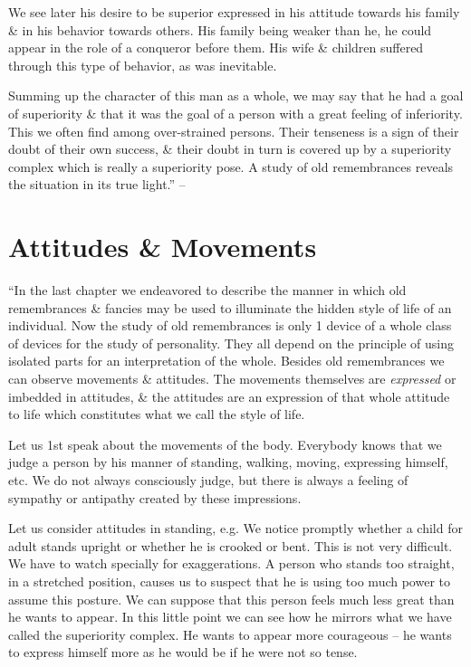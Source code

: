 \documentclass{article}
\numberwithin{equation}{section}
\begin{document}
We see later his desire to be superior expressed in his attitude towards his family \& in his behavior towards others. His family being weaker than he, he could appear in the role of a conqueror before them. His wife \& children suffered through this type of behavior, as was inevitable.

Summing up the character of this man as a whole, we may say that he had a goal of superiority \& that it was the goal of a person with a great feeling of inferiority. This we often find among over-strained persons. Their tenseness is a sign of their doubt of their own success, \& their doubt in turn is covered up by a superiority complex which is really a superiority pose. A study of old remembrances reveals the situation in its true light.'' -- \cite[pp. 117--134]{Adler2013}


\section{Attitudes \& Movements}
``In the last chapter we endeavored to describe the manner in which old remembrances \& fancies may be used to illuminate the hidden style of life of an individual. Now the study of old remembrances is only 1 device of a whole class of devices for the study of personality. They all depend on the principle of using isolated parts for an interpretation of the whole. Besides old remembrances we can observe movements \& attitudes. The movements themselves are \textit{expressed} or imbedded in attitudes, \& the attitudes are an expression of that whole attitude to life which constitutes what we call the style of life.

Let us 1st speak about the movements of the body. Everybody knows that we judge a person by his manner of standing, walking, moving, expressing himself, etc. We do not always consciously judge, but there is always a feeling of sympathy or antipathy created by these impressions.

Let us consider attitudes in standing, e.g. We notice promptly whether a child for adult stands upright or whether he is crooked or bent. This is not very difficult. We have to watch specially for exaggerations. A person who stands too straight, in a stretched position, causes us to suspect that he is using too much power to assume this posture. We can suppose that this person feels much less great than he wants to appear. In this little point we can see how he mirrors what we have called the superiority complex. He wants to appear more courageous -- he wants to express himself more as he would be if he were not so tense.
\end{document}
